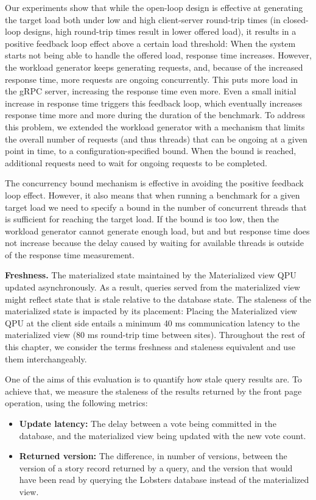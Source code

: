 Our experiments show that while the open-loop design is effective at generating the target load
both under low and high client-server round-trip times (in closed-loop designs, high round-trip times result in lower offered load),
it results in a positive feedback loop effect above a certain load threshold:
When the system starts not being able to handle the offered load, response time increases.
However, the workload generator keeps generating requests, and, because of the increased response time,
more requests are ongoing concurrently.
This puts more load in the gRPC server, increasing the response time even more.
Even a small initial increase in response time triggers this feedback loop,
which eventually increases response time more and more during the duration of the benchmark.
To address this problem, we extended the workload generator with a mechanism that limits the overall number of requests
(and thus threads) that can be ongoing at a given point in time, to a configuration-specified bound.
When the bound is reached, additional requests need to wait for ongoing requests to be completed.

The concurrency bound mechanism is effective in avoiding the positive feedback loop effect.
However, it also means that when running a benchmark for a given target load we need to specify a bound in the number of
concurrent threads that is sufficient for reaching the target load.
If the bound is too low, then the workload generator cannot generate enough load, but and but response time does not
increase because the delay caused by waiting for available threads is outside of the response time measurement.

\bigskip
\noindent
\textbf{Freshness.} The materialized state maintained by the Materialized view QPU updated asynchronously.
As a result, queries served from the materialized view might reflect state that is stale relative to the database state.
The staleness of the materialized state is impacted by its placement:
Placing the Materialized view QPU at the client side entails a minimum 40 ms communication latency to the materialized view
(80 ms round-trip time between sites).
Throughout the rest of this chapter, we consider the terms freshness and staleness equivalent and use them interchangeably.

One of the aims of this evaluation is to quantify how stale query results are.
To achieve that, we measure the staleness of the results returned by the front page operation,
using the following metrics:
\begin{itemize}
  \item \textbf{Update latency:} The delay between a vote being committed in the database, and the materialized view being
  updated with the new vote count.
  \item \textbf{Returned version:} The difference, in number of versions, between the version of a story record returned by a query,
  and the version that would have been read by querying the Lobsters database instead of the materialized view.
\end{itemize}

